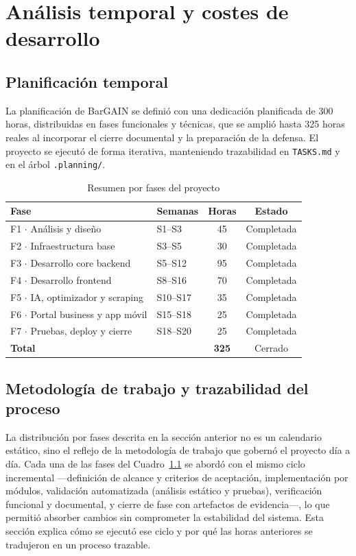 \chapter{An\'alisis temporal y costes de desarrollo}\label{analtemporal}

\section{Planificaci\'on temporal}

La planificaci\'on de BarGAIN se defini\'o con una dedicaci\'on planificada de 300 horas,
distribuidas en fases funcionales y t\'ecnicas, que se ampli\'o hasta 325 horas reales al
incorporar el cierre documental y la preparaci\'on de la defensa. El proyecto se ejecut\'o de
forma iterativa, manteniendo trazabilidad en \texttt{TASKS.md} y en el \'arbol
\texttt{.planning/}.

\begin{table}[htbp]
\centering
\caption{Resumen por fases del proyecto}
\label{tab:fases-temporales}
\begin{tabular}{@{}llcc@{}}
\toprule
\textbf{Fase} & \textbf{Semanas} & \textbf{Horas} & \textbf{Estado} \\
\midrule
F1 $\cdot$ An\'alisis y dise\~no & S1--S3 & 45 & Completada \\
F2 $\cdot$ Infraestructura base & S3--S5 & 30 & Completada \\
F3 $\cdot$ Desarrollo core backend & S5--S12 & 95 & Completada \\
F4 $\cdot$ Desarrollo frontend & S8--S16 & 70 & Completada \\
F5 $\cdot$ IA, optimizador y scraping & S10--S17 & 35 & Completada \\
F6 $\cdot$ Portal business y app m\'ovil & S15--S18 & 25 & Completada \\
F7 $\cdot$ Pruebas, deploy y cierre & S18--S20 & 25 & Completada \\
\midrule
\textbf{Total} & & \textbf{325} & Cerrado \\
\bottomrule
\end{tabular}
\end{table}

\section{Metodolog\'ia de trabajo y trazabilidad del proceso}\label{sec:metodologia-trazabilidad}

La distribuci\'on por fases descrita en la secci\'on anterior no es un calendario est\'atico, sino
el reflejo de la metodolog\'ia de trabajo que gobern\'o el proyecto d\'ia a d\'ia. Cada una de las
fases del Cuadro~\ref{tab:fases-temporales} se abord\'o con el mismo ciclo incremental ---definici\'on
de alcance y criterios de aceptaci\'on, implementaci\'on por m\'odulos, validaci\'on automatizada
(an\'alisis est\'atico y pruebas), verificaci\'on funcional y documental, y cierre de fase con
artefactos de evidencia---, lo que permiti\'o absorber cambios sin comprometer la estabilidad del
sistema. Esta secci\'on explica c\'omo se ejecut\'o ese ciclo y por qu\'e las horas anteriores se
tradujeron en un proceso trazable.

